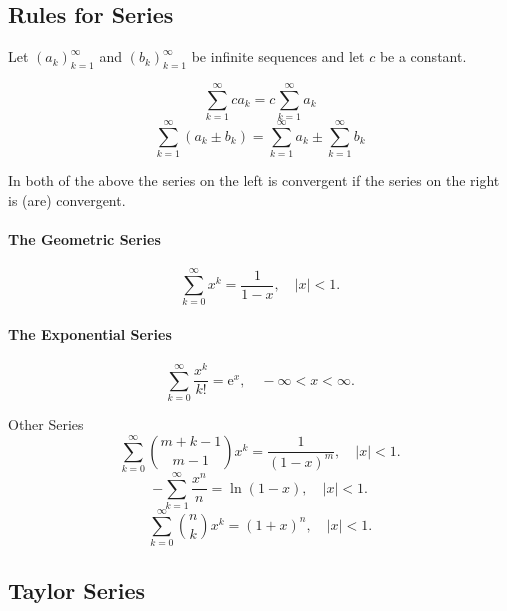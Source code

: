 \documentclass[captions=tableheading]{scrbook}
\begin{document}
\subsection{Rules for Series}
\label{sec-6-3-3}


Let $\left(a_{k}\right)_{k=1}^{\infty}$ and $\left(b_{k}\right)_{k=1}^{\infty}$ be infinite sequences and let $c$ be a constant.

\begin{equation}
\sum_{k=1}^{\infty}ca_{k}=c\sum_{k=1}^{\infty}a_{k}
\end{equation}
\begin{equation}
\sum_{k=1}^{\infty}(a_{k}\pm b_{k})=\sum_{k=1}^{\infty}a_{k}\pm\sum_{k=1}^{\infty}b_{k}
\end{equation}

In both of the above the series on the left is convergent if the series on the right is (are) convergent.

\paragraph*{The Geometric Series}
\begin{equation}
\sum_{k=0}^{\infty} x^{k} = \frac{1}{1 - x},\quad|x| < 1.\label{eq:geom-series}
\end{equation}

\paragraph*{The Exponential Series}
\begin{equation}
\sum_{k=0}^{\infty}\frac{x^{k}}{k!} = \mathrm{e}^{x},\quad -\infty < x < \infty. \label{eq:exp-series}
\end{equation}

Other Series
\begin{equation}
\sum_{k=0}^{\infty}{m+k-1 \choose m-1}x^{k}=\frac{1}{(1-x)^{m}},\quad|x|<1.\label{eq:negbin-series}
\end{equation}
\begin{equation}
-\sum_{k=1}^{\infty}\frac{x^{n}}{n}=\ln(1-x),\quad|x|<1.\label{eq:log-series}
\end{equation}
\begin{equation}
\sum_{k=0}^{\infty}{n \choose k}x^{k}=(1+x)^{n},\quad|x|<1.\label{eq:binom-series-infinite}
\end{equation}
\subsection{Taylor Series}
\label{sec-6-3-4}
\end{document}
